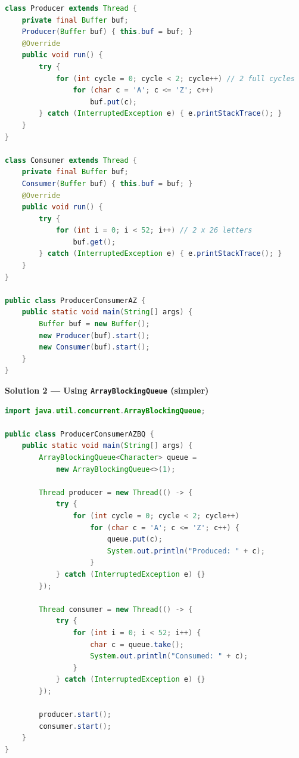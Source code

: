 \documentclass[12pt,a3paper]{article}
\begin{document}
\begin{enumerate}
\begin{tcolorbox}
\begin{lstlisting}[language=Java]
class Producer extends Thread {
    private final Buffer buf;
    Producer(Buffer buf) { this.buf = buf; }
    @Override
    public void run() {
        try {
            for (int cycle = 0; cycle < 2; cycle++) // 2 full cycles
                for (char c = 'A'; c <= 'Z'; c++)
                    buf.put(c);
        } catch (InterruptedException e) { e.printStackTrace(); }
    }
}

class Consumer extends Thread {
    private final Buffer buf;
    Consumer(Buffer buf) { this.buf = buf; }
    @Override
    public void run() {
        try {
            for (int i = 0; i < 52; i++) // 2 x 26 letters
                buf.get();
        } catch (InterruptedException e) { e.printStackTrace(); }
    }
}

public class ProducerConsumerAZ {
    public static void main(String[] args) {
        Buffer buf = new Buffer();
        new Producer(buf).start();
        new Consumer(buf).start();
    }
}
\end{lstlisting}

\medskip
\textbf{Solution 2 --- Using \texttt{ArrayBlockingQueue} (simpler)}

\begin{lstlisting}[language=Java]
import java.util.concurrent.ArrayBlockingQueue;

public class ProducerConsumerAZBQ {
    public static void main(String[] args) {
        ArrayBlockingQueue<Character> queue =
            new ArrayBlockingQueue<>(1);

        Thread producer = new Thread(() -> {
            try {
                for (int cycle = 0; cycle < 2; cycle++)
                    for (char c = 'A'; c <= 'Z'; c++) {
                        queue.put(c);
                        System.out.println("Produced: " + c);
                    }
            } catch (InterruptedException e) {}
        });

        Thread consumer = new Thread(() -> {
            try {
                for (int i = 0; i < 52; i++) {
                    char c = queue.take();
                    System.out.println("Consumed: " + c);
                }
            } catch (InterruptedException e) {}
        });

        producer.start();
        consumer.start();
    }
}
\end{lstlisting}

\end{tcolorbox}


\end{enumerate}
\end{document}
